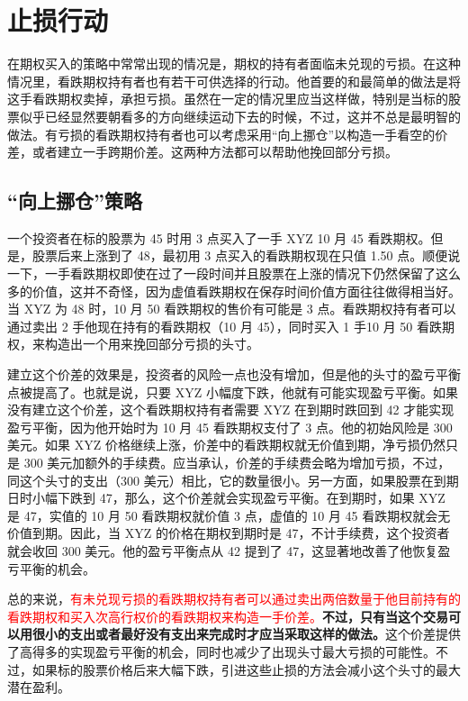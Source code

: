 \section{止损行动}
在期权买入的策略中常常出现的情况是，期权的持有者面临未兑现的亏损。在这种情况里，看跌期权持有者也有若干可供选择的行动。他首要的和最简单的做法是将这手看跌期权卖掉，承担亏损。虽然在一定的情况里应当这样做，特别是当标的股票似乎已经显然要朝看多的方向继续运动下去的时候，不过，这并不总是最明智的做法。有亏损的看跌期权持有者也可以考虑采用“向上挪仓”以构造一手看空的价差，或者建立一手跨期价差。这两种方法都可以帮助他挽回部分亏损。
\subsection{“向上挪仓”策略}
\begin{tcolorbox}
    一个投资者在标的股票为 45 时用 3 点买入了一手 XYZ 10 月 45 看跌期权。但是，股票后来上涨到了 48，最初用 3 点买入的看跌期权现在只值 1.50 点。顺便说一下，一手看跌期权即使在过了一段时间并且股票在上涨的情况下仍然保留了这么多的价值，这并不奇怪，因为虚值看跌期权在保存时间价值方面往往做得相当好。当 XYZ 为 48 时，10 月 50 看跌期权的售价有可能是 3 点。看跌期权持有者可以通过卖出 2 手他现在持有的看跌期权（10 月 45），同时买入 1 手10 月 50 看跌期权，来构造出一个用来挽回部分亏损的头寸。
\end{tcolorbox}

建立这个价差的效果是，投资者的风险一点也没有增加，但是他的头寸的盈亏平衡点被提高了。也就是说，只要 XYZ 小幅度下跌，他就有可能实现盈亏平衡。如果没有建立这个价差，这个看跌期权持有者需要 XYZ 在到期时跌回到 42 才能实现盈亏平衡，因为他开始时为 10 月 45 看跌期权支付了 3 点。他的初始风险是 300 美元。如果 XYZ 价格继续上涨，价差中的看跌期权就无价值到期，净亏损仍然只是 300 美元加额外的手续费。应当承认，价差的手续费会略为增加亏损，不过，同这个头寸的支出（300 美元）相比，它的数量很小。另一方面，如果股票在到期日时小幅下跌到 47，那么，这个价差就会实现盈亏平衡。在到期时，如果 XYZ 是 47，实值的 10 月 50 看跌期权就价值 3 点，虚值的 10 月 45 看跌期权就会无价值到期。因此，当 XYZ 的价格在期权到期时是 47，不计手续费，这个投资者就会收回 300 美元。他的盈亏平衡点从 42 提到了 47，这显著地改善了他恢复盈亏平衡的机会。

总的来说，\textcolor{red}{有未兑现亏损的看跌期权持有者可以通过卖出两倍数量于他目前持有的看跌期权和买入次高行权价的看跌期权来构造一手价差。}\textbf{不过，只有当这个交易可以用很小的支出或者最好没有支出来完成时才应当采取这样的做法。}这个价差提供了高得多的实现盈亏平衡的机会，同时也减少了出现头寸最大亏损的可能性。不过，如果标的股票价格后来大幅下跌，引进这些止损的方法会减小这个头寸的最大潜在盈利。
